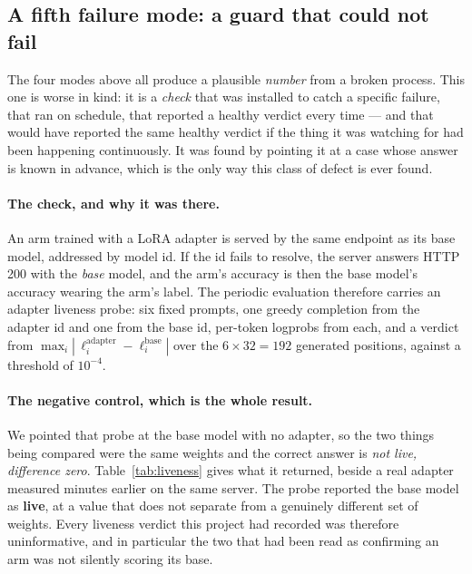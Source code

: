 \subsection{A fifth failure mode: a guard that could not fail}
\label{sec:liveness}

The four modes above all produce a plausible \emph{number} from a broken process. This one is
worse in kind: it is a \emph{check} that was installed to catch a specific failure, that ran
on schedule, that reported a healthy verdict every time --- and that would have reported the
same healthy verdict if the thing it was watching for had been happening continuously. It was
found by pointing it at a case whose answer is known in advance, which is the only way this
class of defect is ever found.

\paragraph{The check, and why it was there.} An arm trained with a LoRA adapter is served by
the same endpoint as its base model, addressed by model id. If the id fails to resolve, the
server answers HTTP 200 with the \emph{base} model, and the arm's accuracy is then the base
model's accuracy wearing the arm's label. The periodic evaluation therefore carries an adapter
liveness probe: six fixed prompts, one greedy completion from the adapter id and one from the
base id, per-token logprobs from each, and a verdict from
$\max_i |\,\ell^{\text{adapter}}_i - \ell^{\text{base}}_i|$ over the $6\times 32=192$ generated
positions, against a threshold of $10^{-4}$.

\paragraph{The negative control, which is the whole result.} We pointed that probe at the base
model with no adapter, so the two things being compared were the same weights and the correct
answer is \emph{not live, difference zero}. Table~\ref{tab:liveness} gives what it returned,
beside a real adapter measured minutes earlier on the same server. The probe reported the base
model as \textbf{live}, at a value that does not separate from a genuinely different set of
weights. Every liveness verdict this project had recorded was therefore uninformative, and in
particular the two that had been read as confirming an arm was not silently scoring its base.

